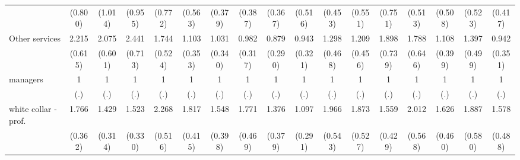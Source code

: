 {\begin{tabular}{l*{16}{c}}
                    &     (0.800)         &     (1.014)         &     (0.955)         &     (0.772)         &     (0.563)         &     (0.379)         &     (0.387)         &     (0.367)         &     (0.516)         &     (0.453)         &     (0.551)         &     (0.751)         &     (0.513)         &     (0.508)         &     (0.523)         &     (0.417)         \\
[1em]
Other services      &       2.215\sym{**} &       2.075\sym{*}  &       2.441\sym{**} &       1.744         &       1.103         &       1.031         &       0.982         &       0.879         &       0.943         &       1.298         &       1.209         &       1.898         &       1.788         &       1.108         &       1.397         &       0.942         \\
                    &     (0.615)         &     (0.601)         &     (0.713)         &     (0.524)         &     (0.353)         &     (0.340)         &     (0.317)         &     (0.290)         &     (0.321)         &     (0.468)         &     (0.456)         &     (0.739)         &     (0.646)         &     (0.399)         &     (0.499)         &     (0.351)         \\
[1em]
managers            &           1         &           1         &           1         &           1         &           1         &           1         &           1         &           1         &           1         &           1         &           1         &           1         &           1         &           1         &           1         &           1         \\
                    &         (.)         &         (.)         &         (.)         &         (.)         &         (.)         &         (.)         &         (.)         &         (.)         &         (.)         &         (.)         &         (.)         &         (.)         &         (.)         &         (.)         &         (.)         &         (.)         \\
[1em]
white collar - prof.&       1.766\sym{**} &       1.429         &       1.523         &       2.268\sym{***}&       1.817\sym{**} &       1.548         &       1.771\sym{*}  &       1.376         &       1.097         &       1.966\sym{*}  &       1.873\sym{*}  &       1.559         &       2.012\sym{*}  &       1.626         &       1.887\sym{*}  &       1.578         \\
                    &     (0.362)         &     (0.314)         &     (0.330)         &     (0.516)         &     (0.415)         &     (0.398)         &     (0.469)         &     (0.379)         &     (0.291)         &     (0.543)         &     (0.527)         &     (0.429)         &     (0.568)         &     (0.460)         &     (0.580)         &     (0.488)         \\

\end{tabular}}
